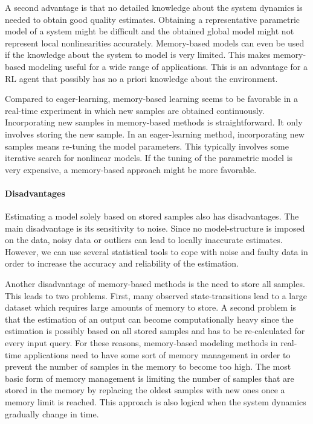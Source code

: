 A second advantage is that no detailed knowledge about the system dynamics is needed to obtain good quality estimates. Obtaining a representative parametric model of a system might be difficult and the obtained global model might not represent local nonlinearities accurately. Memory-based models can even be used if the knowledge about the system to model is very limited. This makes memory-based modeling useful for a wide range of applications. This is an advantage for a \ac{RL} agent that possibly has no a priori knowledge about the environment.

Compared to eager-learning, memory-based learning seems to be favorable in a real-time experiment in which new samples are obtained continuously. Incorporating new samples in memory-based methods is straightforward. It only involves storing the new sample. In an eager-learning method, incorporating new samples means re-tuning the model parameters. This typically involves some iterative search for nonlinear models. If the tuning of the parametric model is very expensive, a memory-based approach might be more favorable.

\paragraph{Disadvantages} Estimating a model solely based on stored samples also has disadvantages. The main disadvantage is its sensitivity to noise. Since no model-structure is imposed on the data, noisy data or outliers can lead to locally inaccurate estimates. However, we can use several statistical tools to cope with noise and faulty data in order to increase the accuracy and reliability of the estimation. 

Another disadvantage of memory-based methods is the need to store all samples. This leads to two problems. First, many observed state-transitions lead to a large dataset which requires large amounts of memory to store. A second problem is that the estimation of an output can become computationally heavy since the estimation is possibly based on all stored samples and has to be re-calculated for every input query. For these reasons, memory-based modeling methods in real-time applications need to have some sort of memory management in order to prevent the number of samples in the memory to become too high. The most basic form of memory management is limiting the number of samples that are stored in the memory by replacing the oldest samples with new ones once a memory limit is reached. This approach is also logical when the system dynamics gradually change in time.










